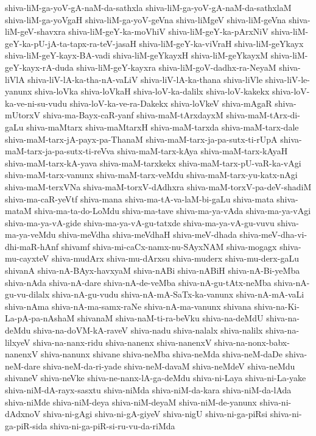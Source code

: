 {shiva-liM-ga-yoV-gA-naM-da-sathxla
shiva-liM-ga-yoV-gA-naM-da-sathxlaM
shiva-liM-ga-yoVgaH
shiva-liM-ga-yoV-geVna
shiva-liMgeV
shiva-liM-geVna
shiva-liM-geV-shavxra
shiva-liM-geY-ka-moVhiV
shiva-liM-geY-ka-pArxNiV
shiva-liM-geY-ka-pU-jA-ta-tapx-ra-teV-jasaH
shiva-liM-geY-ka-viVraH
shiva-liM-geYkayx
shiva-liM-geY-kayx-BA-vadi
shiva-liM-geYkayxH
shiva-liM-geYkayxM
shiva-liM-geY-kayx-rA-duda
shiva-liM-geY-kayxra
shiva-liM-goV-dadhx-ra-NeyaM
shiva-liVlA
shiva-liV-lA-ka-tha-nA-vaLiV
shiva-liV-lA-ka-thana
shiva-liVle
shiva-liV-le-yanunx
shiva-loVka
shiva-loVkaH
shiva-loV-ka-dalilx
shiva-loV-kakekx
shiva-loV-ka-ve-ni-su-vudu
shiva-loV-ka-ve-ra-Dakekx
shiva-loVkeV
shiva-mAgaR
shiva-mUtorxV
shiva-ma-Bayx-caR-yanf
shiva-maM-tArxdayxM
shiva-maM-tArx-di-gaLu
shiva-maMtarx
shiva-maMtarxH
shiva-maM-tarxda
shiva-maM-tarx-dale
shiva-maM-tarx-jA-payx-pa-ThanaM
shiva-maM-tarx-ja-pa-sutx-ti-rUpA
shiva-maM-tarx-ja-pa-sutx-ti-reVva
shiva-maM-tarx-kAya
shiva-maM-tarx-kAyaH
shiva-maM-tarx-kA-yava
shiva-maM-tarxkekx
shiva-maM-tarx-pU-vaR-ka-vAgi
shiva-maM-tarx-vanunx
shiva-maM-tarx-veMdu
shiva-maM-tarx-yu-katx-nAgi
shiva-maM-terxVNa
shiva-maM-torxV-dAdhxra
shiva-maM-torxV-pa-deV-shadiM
shiva-ma-caR-yeVtf
shiva-mana
shiva-ma-tA-va-laM-bi-gaLu
shiva-mata
shiva-mataM
shiva-ma-ta-do-LoMdu
shiva-ma-tave
shiva-ma-ya-vAda
shiva-ma-ya-vAgi
shiva-ma-ya-vA-gide
shiva-ma-ya-vA-gu-tatxde
shiva-ma-ya-vA-gu-vuvu
shiva-ma-ya-veMdu
shiva-meVdha
shiva-meVdhaH
shiva-meV-dhada
shiva-meV-dha-vi-dhi-maR-hAnf
shivamf
shiva-mi-caCx-namx-nu-SAyxNAM
shiva-mogagx
shiva-mu-cayxteV
shiva-mudArx
shiva-mu-dArxsu
shiva-muderx
shiva-mu-derx-gaLu
shivanA
shiva-nA-BAyx-havxyaM
shiva-nABi
shiva-nABiH
shiva-nA-Bi-yeMba
shiva-nAda
shiva-nA-dare
shiva-nA-de-veMba
shiva-nA-gu-tAtx-neMba
shiva-nA-gu-vu-dilalx
shiva-nA-gu-vudu
shiva-nA-mA-SaTx-ka-vanunx
shiva-nA-mA-vaLi
shiva-nAma
shiva-nA-ma-samx-raNe
shiva-nA-ma-vanunx
shivana
shiva-na-Ki-La-pA-pa-nAshaM
shivanaM
shiva-naM-ti-ra-beVku
shiva-na-deMdU
shiva-na-deMdu
shiva-na-doVM-kA-raveV
shiva-nadu
shiva-nalalx
shiva-nalilx
shiva-na-lilxyeV
shiva-na-nanx-ridu
shiva-nanenx
shiva-nanenxV
shiva-na-nonx-babx-nanenxV
shiva-nanunx
shivane
shiva-neMba
shiva-neMda
shiva-neM-daDe
shiva-neM-dare
shiva-neM-da-ri-yade
shiva-neM-davaM
shiva-neMdeV
shiva-neMdu
shivaneV
shiva-neVke
shiva-ne-nanx-lA-ga-deMdu
shiva-ni-Laya
shiva-ni-La-yake
shiva-niM-dA-rayx-sasxtu
shiva-niMda
shiva-niM-da-kara
shiva-niM-da-lAda
shiva-niMde
shiva-niM-deya
shiva-niM-deyaM
shiva-niM-de-yanunx
shiva-ni-dAdxnoV
shiva-ni-gAgi
shiva-ni-gA-giyeV
shiva-nigU
shiva-ni-ga-piRsi
shiva-ni-ga-piR-sida
shiva-ni-ga-piR-si-ru-vu-da-riMda
}
